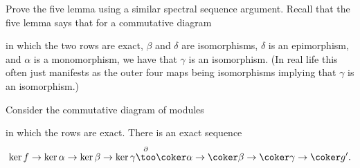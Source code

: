 \documentclass[10pt]{article}
\begin{document}
\begin{exercise}
    \label{exer:five-lemma}
    Prove the five lemma using a similar spectral sequence argument.
    Recall that the five lemma says that for a commutative diagram
    \begin{center}
    \end{center}
    in which the two rows are exact,
    $\beta$ and $\delta$ are isomorphisms,
    $\delta$ is an epimorphism, and $\alpha$ is a monomorphism,
    we have that $\gamma$ is an isomorphism.
    (In real life this often just manifests as
    the outer four maps being isomorphisms
    implying that $\gamma$ is an isomorphism.)
\end{exercise}

\begin{prop}
    \label{prop:snake-lemma}
    Consider the commutative diagram of modules
    \begin{center}
    \end{center}
    in which the rows are exact.
    There is an exact sequence
    \begin{equation*}
        \ker f\to \ker\alpha\to\ker\beta\to\ker\gamma
	\overset\partial\too\coker\alpha\to\coker\beta\to\coker\gamma
	\to\coker g'.
    \end{equation*}
\end{prop}
\end{document}
